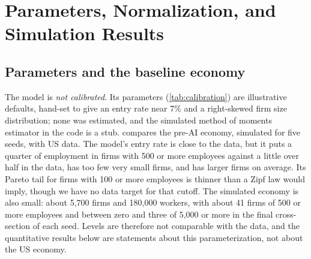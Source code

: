 \section{Parameters, Normalization, and Simulation Results}\label{sec:simulation}


\subsection{Parameters and the baseline economy}\label{sec:sim-parameters}

The model is \emph{not calibrated}.
Its parameters (\cref{tab:calibration}) are illustrative defaults, hand-set to give an entry rate near 7\% and a right-skewed firm size distribution; none was estimated, and the simulated method of moments estimator in the code is a stub.
 compares the pre-AI economy, simulated for five seeds, with US data.
The model's entry rate is close to the data, but it puts a quarter of employment in firms with 500 or more employees against a little over half in the data, has too few very small firms, and has larger firms on average.
Its Pareto tail for firms with 100 or more employees is thinner than a Zipf law would imply, though we have no data target for that cutoff.
The simulated economy is also small: about 5,700 firms and 180,000 workers, with about 41 firms of 500 or more employees and between zero and three of 5,000 or more in the final cross-section of each seed.
Levels are therefore not comparable with the data, and the quantitative results below are statements about this parameterization, not about the US economy.

